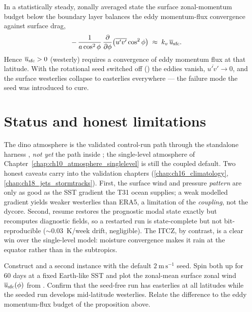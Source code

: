 \begin{proposition}
In a statistically steady, zonally averaged state the surface zonal-momentum
budget below the boundary layer balances the eddy momentum-flux convergence
against surface drag,
\begin{equation}
  -\,\frac{1}{a\cos^2\phi}\,\frac{\partial }{\partial \phi}\big(\overline{u'v'}\cos^2\phi\big)
  \;\approx\; k_v\,\overline{u}_{\mathrm{sfc}} .
\end{equation}
Hence $\overline{u}_{\mathrm{sfc}}>0$ (westerly) requires a convergence of eddy
momentum flux at that latitude. With the rotational seed switched off
() the eddies vanish, $\overline{u'v'}\to 0$, and the
surface westerlies collapse to easterlies everywhere --- the failure mode the seed
was introduced to cure.
\end{proposition}

\section{Status and honest limitations}

The dino atmosphere is the validated control-run path through the standalone
harness , \emph{not yet} the path inside ; the
single-level atmosphere of Chapter~\ref{chap:ch10_atmosphere_singlelevel} is still
the coupled default. Two honest caveats carry into the validation chapters
(\ref{chap:ch16_climatology}, \ref{chap:ch18_jets_stormtracks}). First, the
surface wind and pressure \emph{pattern} are only as good as the SST gradient the
T31 ocean supplies; a weak modelled gradient yields weaker westerlies than ERA5,
a limitation of the \emph{coupling}, not the dycore. Second, resume restores the
prognostic modal state exactly but recomputes diagnostic fields, so a restarted
run is state-complete but not bit-reproducible ($\sim 0.03$~K/week drift,
negligible). The ITCZ, by contrast, is a clear win over the single-level model:
moisture convergence makes it rain at the equator rather than in the subtropics.

\begin{exercise}
Construct  and a second instance with the
default $2\ \mathrm{m\,s^{-1}}$ seed. Spin both up for $60$ days at a fixed
Earth-like SST and plot the zonal-mean surface zonal wind
$\overline{u}_{\mathrm{sfc}}(\phi)$ from . Confirm that the
seed-free run has easterlies at all latitudes while the seeded run develops
mid-latitude westerlies. Relate the difference to the eddy momentum-flux budget of
the proposition above.
\end{exercise}

